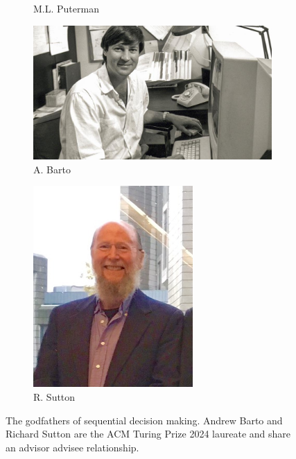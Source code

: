 \begin{figure}
\begin{subfigure}[b]{0.22\textwidth}
        \caption{M.L. Puterman}
    \end{subfigure}
    \hfill
    \begin{subfigure}[b]{0.22\textwidth}
        \centering
        \includegraphics[width=1.2\textwidth]{images/images_intro/Barto_1982_umass_amherst.jpg}
        \caption{A. Barto}
    \end{subfigure}
    \hfill
    \begin{subfigure}[b]{0.22\textwidth}
        \centering
        \includegraphics[width=0.67\textwidth]{images/images_intro/sutton.jpg}
        \caption{R. Sutton}
    \end{subfigure}
       \caption{The godfathers of sequential decision making. Andrew Barto and Richard Sutton are the ACM Turing Prize 2024 laureate and share an advisor advisee relationship.}
       \label{fig:rl-pioneers}
\end{figure}
